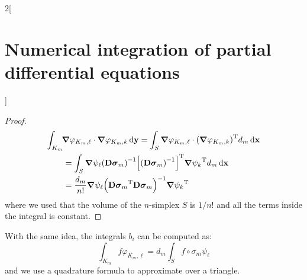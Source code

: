 \documentclass[../../../main_math.tex]{subfiles}
\begin{document}
\begin{multicols}{2}[\section{Numerical integration of partial differential equations}]
\begin{proof}
    \begin{align*}
      \int_{K_m} & \!\grad\varphi_{K_m,\ell}\cdot \grad\varphi_{K_m,k}\dd{\boldsymbol{\mathrm{y}}}  =\int_S\grad\varphi_{K_m,\ell}\cdot {\left(\grad\varphi_{K_m,k}\right)}^{\mathrm{T}}d_m\dd{\boldsymbol{\mathrm{x}}} \\
                 & =\int_S\grad\psi_\ell{\left(\boldsymbol{\mathrm{D\sigma}}_m\right)}^{-1}{\left[{\left(\boldsymbol{\mathrm{D\sigma}}_m\right)}^{-1}\right]}^{\mathrm{T}}{\grad\psi_k}^{\mathrm{T}}d_m\dd{\boldsymbol{\mathrm{x}}}         \\
                 & =\frac{d_m}{n!}\grad\psi_\ell{\left({\boldsymbol{\mathrm{D\sigma}}_m}^{\mathrm{T}}\boldsymbol{\mathrm{D\sigma}}_m\right)}^{-1}{\grad\psi_k}^{\mathrm{T}}
    \end{align*}
    where we used that the volume of the $n$-simplex $S$ is $1/n!$ and all the terms inside the integral is constant.
  \end{proof}
  \begin{remark}
    With the same idea, the integrals $b_i$ can be computed as:
    $$
      \int_{K_m}f\varphi_{K_m,\ell}=d_m\int_Sf\circ\sigma_m\psi_\ell
    $$
    and we use a quadrature formula to approximate over a triangle.
  \end{remark}
\end{multicols}
\end{document}
